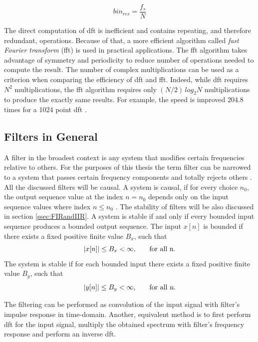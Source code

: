 \begin{equation}
\label{eq:DFTres}
bin_{res} = \frac{f_s}{N}
\end{equation}

The direct computation of \gls{dft} is inefficient and contains repeating, and therefore redundant, operations. Because of that, a more efficient algorithm called \emph{fast Fourier transform} (\gls{fft}) is used in practical applications. The \gls{fft} algorithm takes advantage of symmetry and periodicity to reduce number of operations needed to compute the result. The number of complex multiplications can be used as a criterion when comparing the efficiency of \gls{dft} and \gls{fft}. Indeed, while \gls{dft} requires $N^2$ multiplications, the \gls{fft} algorithm requires only $(N/2)\,log_2N$ multiplications to produce the exactly same results. For example, the speed is improved $204.8$ times for a 1024 point \gls{dft} \cite[p. 459]{DSP3}.

\subsection{Filters in General}
A filter in the broadest context is any system that modifies certain frequencies relative to others. For the purposes of this thesis the term filter can be narrowed to a system that passes certain frequency components and totally rejects others \cite[p. 439]{DSP}. All the discussed filters will be causal. A system is causal, if for every choice $n_0$, the output sequence value at the index $n = n_0$ depends only on the input sequence values where index $n \leq n_0$ \cite[p. 21]{DSP}. The stability of filters will be also discussed in section \ref{ssec:FIRandIIR}. A system is stable if and only if every bounded input sequence produces a bounded output sequence. The input $x[n]$ is bounded if there exists a fixed positive finite value $B_x$, such that \cite[p. 21]{DSP}
\begin{equation}
	|x[n]| \leq B_x < \infty\text{,\qquad for all n.}
\end{equation}
The system is stable if for each bounded input there exists a fixed positive finite value $B_y$, such that \cite[p. 22]{DSP}
\begin{equation}
	|y[n]| \leq B_y < \infty\text{,\qquad for all n.}
\end{equation}

The filtering can be performed as convolution of the input signal with filter's impulse response in time-domain. Another, equivalent method is to first perform \gls{dft} for the input signal, multiply the obtained spectrum with filter's frequency response and perform an inverse \gls{dft}. 

